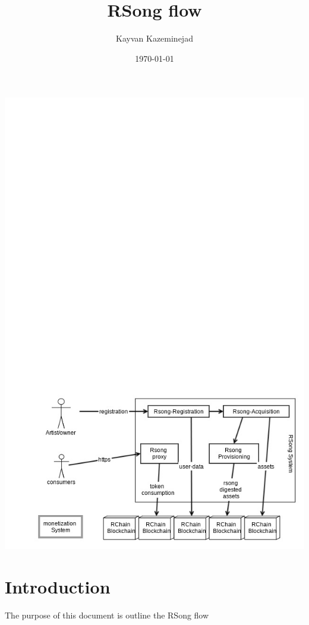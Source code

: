 \documentclass[11pt]{article}
\author{Kayvan Kazeminejad}
\date{\today}
\title{RSong flow}
\begin{document}
\maketitle
\begin{center}
\includegraphics[width=.9\linewidth]{./design/Rsong-System-view.jpeg}
\end{center}

\section*{Introduction}
\label{sec:orgd347dd9}
The purpose of this document is outline the RSong flow
\end{document}

